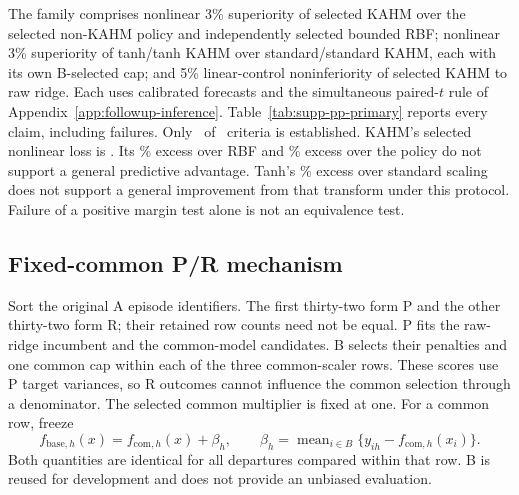 The family comprises nonlinear 3\% superiority of selected KAHM over the
selected non-KAHM policy and independently selected bounded RBF; nonlinear
3\% superiority of tanh/tanh KAHM over standard/standard KAHM, each with
its own B-selected cap; and 5\% linear-control noninferiority of selected
KAHM to raw ridge. Each uses calibrated forecasts and the simultaneous
paired-$t$ rule of Appendix~\ref{app:followup-inference}.
Table~\ref{tab:supp-pp-primary} reports every claim, including failures.
Only \PPPrimaryEstablished\ of \PPPrimaryCount\ criteria is established.
KAHM's selected nonlinear loss is \PPNonlinearLoss. Its
\PPRBFPenalty\% excess over RBF and \PPPolicyPenalty\% excess over the
policy do not support a general predictive advantage. Tanh's
\PPTanhPenalty\% excess over standard scaling does not support a general
improvement from that transform under this protocol. Failure of a positive
margin test alone is not an equivalence test.

\begin{table}[t]
\centering\small
\caption{All four primary preprocessing comparisons. Gains are
$100(1-L_c/L_m)$; lower gaps apply the 3\% superiority or 5\% linear
noninferiority margin and a four-comparison Bonferroni correction.
The sampling units are \PPRepetitions\ repetition aggregates.}
\label{tab:supp-pp-primary}

\end{table}

\subsection{Fixed-common P/R mechanism}

Sort the original A episode identifiers. The first thirty-two form P and
the other thirty-two form R; their retained row counts need not be equal.
P fits the raw-ridge incumbent and the common-model candidates. B selects
their penalties and one common cap within each of the three common-scaler
rows. These scores use P target variances, so R outcomes cannot influence
the common selection through a denominator. The selected common multiplier
is fixed at one. For a common row, freeze
\[
 f_{\mathrm{base},h}(x)=f_{\mathrm{com},h}(x)+\beta_h,
 \qquad \beta_h=\operatorname{mean}_{i\in B}
       \{y_{ih}-f_{\mathrm{com},h}(x_i)\}.
\]
Both quantities are identical for all departures compared within that row.
B is reused for development and does not provide an unbiased evaluation.

